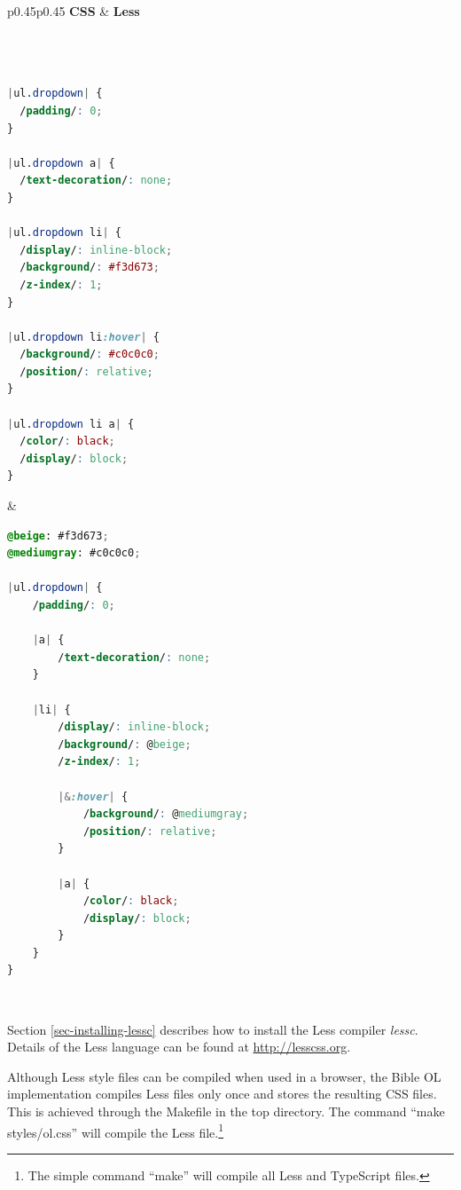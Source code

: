 \documentclass[11pt,oneside,a4paper]{memoir}
\begin{document}
\begin{center}
\begin{tabular}{p{}p{}}
\hline
\textbf{CSS} & \textbf{Less}\\
\hline
\begin{lstlisting}[language=CSS,aboveskip=0mm,belowskip=0mm]



|ul.dropdown| {
  /padding/: 0;
}

|ul.dropdown a| {
  /text-decoration/: none;
}

|ul.dropdown li| {
  /display/: inline-block;
  /background/: #f3d673;
  /z-index/: 1;
}

|ul.dropdown li:hover| {
  /background/: #c0c0c0;
  /position/: relative;
}

|ul.dropdown li a| {
  /color/: black;
  /display/: block;
}
\end{lstlisting}

&

\begin{lstlisting}[language=CSS,aboveskip=0mm,belowskip=0mm]
@beige: #f3d673;
@mediumgray: #c0c0c0;

|ul.dropdown| {
    /padding/: 0;

    |a| {
        /text-decoration/: none;
    }

    |li| {
        /display/: inline-block;
        /background/: @beige;
        /z-index/: 1;

        |&:hover| {
            /background/: @mediumgray;
            /position/: relative;
        }

        |a| {
            /color/: black;
            /display/: block;
        }
    }
}
\end{lstlisting}\\
\hline
\end{tabular}
\end{center}


\lstset{frame=tb} %


Section \ref{sec-installing-lessc} describes how to install the Less compiler \emph{lessc}. Details of
the Less language can be found at \url{http://lesscss.org}.

Although Less style files can be compiled when used in a browser, the Bible OL implementation
compiles Less files only once and stores the resulting CSS files. This is achieved through the
Makefile in the top directory. The command ``make styles/ol.css'' will compile the Less
file.\footnote{The simple command ``make'' will compile all Less and TypeScript files.}
\end{document}
